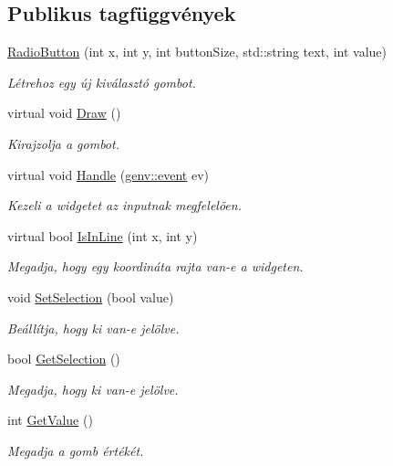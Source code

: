 \subsection*{Publikus tagfüggvények}
\begin{DoxyCompactItemize}
\item 
\hyperlink{class_radio_button_af4fe7e144ad4ff848bcf4261a359c6e3}{Radio\+Button} (int x, int y, int button\+Size, std\+::string text, int value)
\begin{DoxyCompactList}\small\item\em Létrehoz egy új kiválasztó gombot. \end{DoxyCompactList}\item 
virtual void \hyperlink{class_radio_button_a296e30588da8a4767164c2dfc5d25a71}{Draw} ()
\begin{DoxyCompactList}\small\item\em Kirajzolja a gombot. \end{DoxyCompactList}\item 
virtual void \hyperlink{class_radio_button_a9287d026f57bdfedd878269ec4648135}{Handle} (\hyperlink{structgenv_1_1event}{genv\+::event} ev)
\begin{DoxyCompactList}\small\item\em Kezeli a widgetet az inputnak megfelelõen. \end{DoxyCompactList}\item 
virtual bool \hyperlink{class_radio_button_a94ab27ee37cdd639a185cb746ad7b32f}{Is\+In\+Line} (int x, int y)
\begin{DoxyCompactList}\small\item\em Megadja, hogy egy koordináta rajta van-\/e a widgeten. \end{DoxyCompactList}\item 
void \hyperlink{class_radio_button_a23ff4c296d56f8254b8bcb9afe4f5ee9}{Set\+Selection} (bool value)
\begin{DoxyCompactList}\small\item\em Beállítja, hogy ki van-\/e jelölve. \end{DoxyCompactList}\item 
bool \hyperlink{class_radio_button_a80163b8c471be945857d5a32e3a68056}{Get\+Selection} ()
\begin{DoxyCompactList}\small\item\em Megadja, hogy ki van-\/e jelölve. \end{DoxyCompactList}\item 
int \hyperlink{class_radio_button_a1961313659285fab02247085eb87ceee}{Get\+Value} ()
\begin{DoxyCompactList}\small\item\em Megadja a gomb értékét. \end{DoxyCompactList}\end{DoxyCompactItemize}
